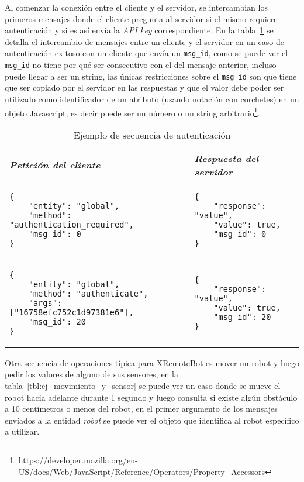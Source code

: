 Al comenzar la conexión entre el cliente y el servidor, se intercambian
los primeros mensajes donde el cliente pregunta al servidor si el
mismo requiere autenticación y si es así envía la \textit{API key}
correspondiente. En la tabla~\ref{tbl:ej_autenticacion} se detalla
el intercambio de mensajes entre un cliente y el servidor en un
caso de autenticación exitoso con un cliente que envía un \texttt{msg\_id},
como se puede ver el \texttt{msg\_id}
no tiene por qué ser consecutivo con el del mensaje anterior, incluso
puede llegar a ser un string, las únicas restricciones sobre el
\texttt{msg\_id} son que tiene que ser copiado por el servidor
en las respuestas y que el valor debe poder ser utilizado como
identificador de un atributo (usando notación con corchetes) en un
objeto Javascript, es decir puede ser un número o un string
arbitrario\footnote{\url{https://developer.mozilla.org/en-US/docs/Web/JavaScript/Reference/Operators/Property\_Accessors}}.

\begin{table}
    \centering
    \begin{tabular}{|m{}|m{}|}
        \hline
        \textit{Petición del cliente} & \textit{Respuesta del servidor} \\
        \hline
\begin{Verbatim}[fontsize=\footnotesize]
{
    "entity": "global",
    "method": "authentication_required",
    "msg_id": 0
}
\end{Verbatim}
&
\begin{Verbatim}[fontsize=\footnotesize]
{
    "response": "value",
    "value": true,
    "msg_id": 0
}
\end{Verbatim}
\\
\hline
\begin{Verbatim}[fontsize=\footnotesize]
{
    "entity": "global",
    "method": "authenticate",
    "args": ["16758efc752c1d97381e6"],
    "msg_id": 20
}
\end{Verbatim}
&
\begin{Verbatim}[fontsize=\footnotesize]
{
    "response": "value",
    "value": true,
    "msg_id": 20
}
\end{Verbatim}
\\
\hline
    \end{tabular}
    \caption{Ejemplo de secuencia de autenticación}
    \label{tbl:ej_autenticacion}
\end{table}

Otra secuencia de operaciones típica para XRemoteBot es mover un robot
y luego pedir los valores de alguno de sus sensores, en la
tabla~\ref{tbl:ej_movimiento_y_sensor} se puede ver un caso donde se
mueve el robot hacia adelante durante 1 segundo y luego consulta si
existe algún obstáculo a 10 centímetros o menos del robot, en el primer
argumento de los mensajes
envíados a la entidad \textit{robot} se puede ver el objeto que identifica
al robot específico a utilizar.

